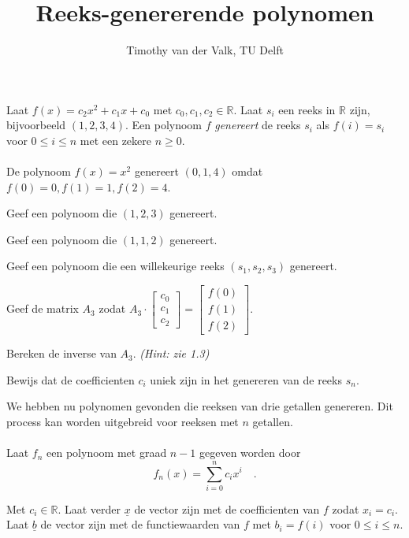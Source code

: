 \documentclass{exam}
\title{Reeks-genererende polynomen}
\author{Timothy van der Valk, TU Delft}
\begin{document}
\maketitle

Laat $f(x) = c_2 x^2 + c_1 x + c_0$ met $c_0,c_1,c_2 \in \mathbb{R}$. 
Laat $s_i$ een reeks in $\mathbb{R}$ zijn, bijvoorbeeld $(1, 2, 3, 4)$. Een polynoom $f$ \textit{genereert} de reeks
$s_i$ als $f(i) = s_i$ voor $0 \leq i \leq n$ met een zekere $n \geq 0$.
\\
\\
De polynoom $f(x) = x^2$ genereert $(0, 1, 4)$ omdat $f(0) = 0, f(1) = 1, f(2) = 4$.

\begin{questions}
\question Geef een polynoom die $(1, 2, 3)$ genereert.

\question Geef een polynoom die $(1, 1, 2)$ genereert.

\question Geef een polynoom die een willekeurige reeks $(s_1, s_2, s_3)$ genereert.

\question Geef de matrix $A_3$ zodat $A_3 \cdot \begin{bmatrix} c_0 \\ c_1 \\ c_2 \end{bmatrix} = \begin{bmatrix} f(0) \\ f(1) \\ f(2) \end{bmatrix}.$

\question Bereken de inverse van $A_3$. {\it(Hint: zie 1.3)}

\question Bewijs dat de coefficienten $c_i$ uniek zijn in het genereren van de reeks $s_n$.

\end{questions}

We hebben nu polynomen gevonden die reeksen van drie getallen genereren. 
Dit process kan worden uitgebreid voor reeksen met $n$ getallen.
\\
\\
Laat $f_n$ een polynoom met graad $n - 1$ gegeven worden door
\begin{equation}
	f_n(x) = \sum_{i=0}^n{c_i x^i} \quad.
\end{equation}

Met $c_i \in \mathbb{R}$. Laat verder $\underline{x}$ de vector zijn met de coefficienten van $f$ zodat $x_i = c_i$. 
Laat $\underline{b}$ de vector zijn met de functiewaarden van $f$ met $b_i = f(i)$ voor $0 \leq i \leq n$.
\end{document}
